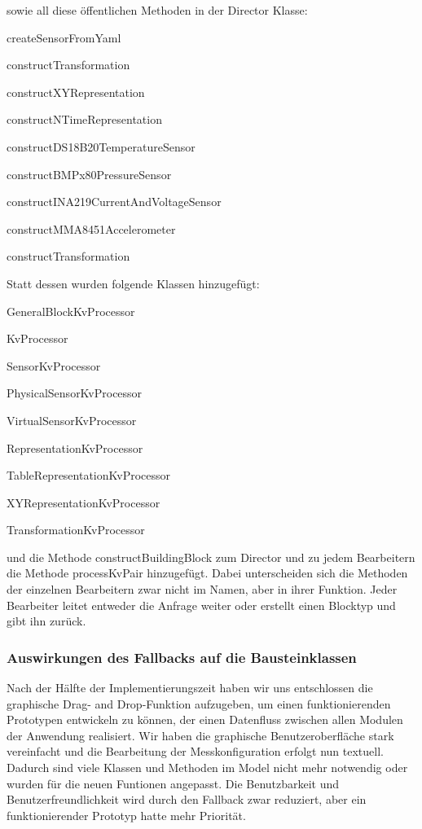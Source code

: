 \documentclass[parskip=full]{scrartcl}
\begin{document}
sowie all diese öffentlichen Methoden in der Director Klasse:

\begin{description}
\item{} createSensorFromYaml
\item{} constructTransformation
\item{} constructXYRepresentation
\item{} constructNTimeRepresentation
\item{} constructDS18B20TemperatureSensor
\item{} constructBMPx80PressureSensor
\item{} constructINA219CurrentAndVoltageSensor
\item{} constructMMA8451Accelerometer
\item{} constructTransformation

\end{description}

Statt dessen wurden folgende Klassen hinzugefügt:
\begin{description}
\item{} GeneralBlockKvProcessor
\item{} KvProcessor
\item{} SensorKvProcessor
\item{} PhysicalSensorKvProcessor
\item{} VirtualSensorKvProcessor
\item{} RepresentationKvProcessor
\item{} TableRepresentationKvProcessor
\item{} XYRepresentationKvProcessor
\item{} TransformationKvProcessor
\end{description}

und die Methode constructBuildingBlock zum Director und zu jedem Bearbeitern die Methode processKvPair hinzugefügt. Dabei unterscheiden sich die Methoden der einzelnen Bearbeitern zwar nicht im Namen, aber in ihrer Funktion. Jeder Bearbeiter leitet entweder die Anfrage weiter oder erstellt einen Blocktyp und gibt ihn zurück. 

\subsubsection{Auswirkungen des Fallbacks auf die Bausteinklassen}
Nach der Hälfte der Implementierungszeit haben wir uns entschlossen die graphische Drag- and Drop-Funktion aufzugeben, um einen funktionierenden Prototypen entwickeln zu können, der einen Datenfluss zwischen allen Modulen der Anwendung realisiert. Wir haben die graphische Benutzeroberfläche stark vereinfacht und die Bearbeitung der Messkonfiguration erfolgt nun textuell. Dadurch sind viele Klassen und Methoden im Model nicht mehr notwendig oder wurden für die neuen Funtionen angepasst. Die Benutzbarkeit und Benutzerfreundlichkeit wird durch den Fallback zwar reduziert, aber ein funktionierender Prototyp hatte mehr Priorität.
\end{document}
